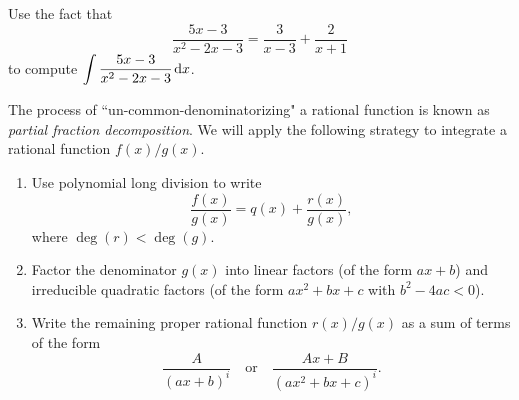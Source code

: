 \setcounter{chapter}{8}
\setcounter{section}{5}
\setcounter{theorem}{0}
\setcounter{equation}{0}


\begin{example}
Use the fact that
\begin{equation*}
\frac{5x-3}{x^2-2x-3} = \frac{3}{x-3} + \frac{2}{x+1}
\end{equation*}
to compute $\displaystyle \int\frac{5x-3}{x^2-2x-3} \mkern 2mu \mathrm{d} x$.
\end{example}
\ifdefined\SOLUTION
{}
\else
\fi

\vfill
\begin{remark}
The process of ``un-common-denominatorizing" a rational function is known as \textit{partial fraction decomposition}.
We will apply the following strategy to integrate a rational function $f(x)/g(x)$.
\begin{enumerate}
\item Use polynomial long division to write 
\begin{equation*}
\frac{f(x)}{g(x)} = q(x) + \frac{r(x)}{g(x)},
\end{equation*}
where $\deg(r)<\deg(g)$.
\item Factor the denominator $g(x)$ into linear factors (of the form $ax+b$) and irreducible quadratic factors (of the form $ax^2+bx+c$ with $b^2-4ac<0$).
\item Write the remaining proper rational function $r(x)/g(x)$ as a sum of terms of the form
\begin{equation*}
\frac{A}{(ax+b)^i}\quad\text{or}\quad\frac{Ax+B}{(ax^2+bx+c)^i}.
\end{equation*}
\end{enumerate}
\end{remark}

